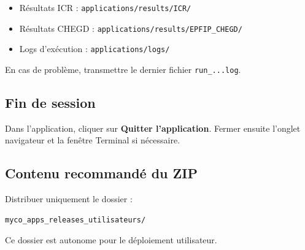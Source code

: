 \documentclass[11pt,a4paper]{article}
\begin{document}
\begin{itemize}
\item Résultats ICR : \texttt{applications/results/ICR/}
\item Résultats CHEGD : \texttt{applications/results/EPFIP\_CHEGD/}
\item Logs d'exécution : \texttt{applications/logs/}
\end{itemize}

En cas de problème, transmettre le dernier fichier \texttt{run\_...log}.

\subsection{Fin de session}

Dans l'application, cliquer sur \textbf{Quitter l'application}. Fermer ensuite l'onglet navigateur et la fenêtre Terminal si nécessaire.

\subsection{Contenu recommandé du ZIP}

Distribuer uniquement le dossier :
\begin{verbatim}
myco_apps_releases_utilisateurs/
\end{verbatim}

Ce dossier est autonome pour le déploiement utilisateur.
\end{document}
